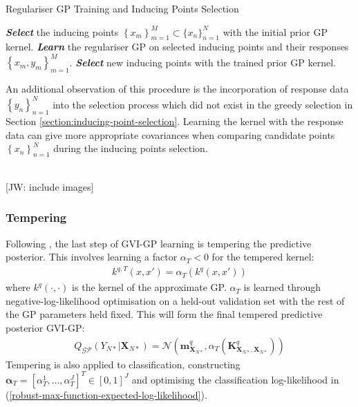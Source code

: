 \documentclass{article}
\newcommand{\jw}[1]{{\color{gray} [JW: #1]}}
\newcommand{\GP}{\operatorname{\mathcal{GP}}}
\numberwithin{equation}{section}
\begin{document}
\begin{algorithm}
\caption{Regulariser GP Training and Inducing Points Selection}
\begin{algorithmic}
 \State \textbf{\textit{Select}} the inducing points $\left\{x_m\right\}_{m=1}^{M} \subset \{x_n\}_{n=1}^{N}$ with the initial prior GP kernel.
\State \textbf{\textit{Learn}} the regulariser GP on selected inducing points and their responses $\left\{x_m, y_m\right\}_{m=1}^{M}$.
\State  \textbf{\textit{Select}} new inducing points with the trained prior GP kernel.
\EndWhile
\end{algorithmic}
\end{algorithm}
An additional observation of this procedure is the incorporation of response data $\left\{y_n\right\}_{n=1}^N$ into the selection process which did not exist in the greedy selection in Section \ref{section:inducing-point-selection}. Learning the kernel with the response data can give more appropriate covariances when comparing candidate points $\left\{x_n\right\}_{n=1}^N$ during the inducing points selection.

\\\jw{include images}

\subsubsection{Tempering}
Following \cite{wild2022generalized}, the last step of GVI-GP learning is tempering the predictive posterior. This involves learning a factor $\alpha_T < 0$ for the tempered kernel:
\begin{align}
    k^{q, T}(x, x') = \alpha_T \left( k^q(x, x')\right)
\end{align}
where $k^q(\cdot, \cdot)$ is the kernel of the approximate GP. $\alpha_T$ is learned through negative-log-likelihood optimisation on a held-out validation set with the rest of the GP parameters held fixed. This will form the final tempered predictive posterior GVI-GP:
\begin{align}
    Q_{\GP}(Y_{N*} \vert \mathbf{X}_{N*}) = \mathcal{N}\left(\mathbf{m}^q_{\mathbf{X}_{N*}}, \alpha_T \left(\mathbf{K}^q_{\mathbf{X}_{N*}, \mathbf{X}_{N*}}\right)\right)
\end{align}
 Tempering is also applied to classification, constructing $\boldsymbol{\alpha}_T = \left[\alpha_T^1, \dots, \alpha_T^J \right]^T \in [0, 1]^J$ and optimising the classification log-likelihood in (\ref{robust-max-function-expected-log-likelihood}).
\end{document}
